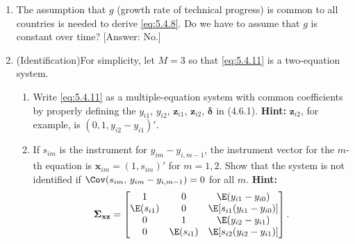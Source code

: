\begin{enumerate}
\item The assumption that $g$ (growth rate of technical progress) is common to all
  countries is needed to derive \eqref{eq:5.4.8}. Do we have to assume that $g$ is constant
  over time? [Answer: No.]

\item (Identification)\quad For simplicity, let $M = 3$ so that \eqref{eq:5.4.11} is a two-equation
  system.
  \begin{enumerate}[label=(\alph*)]
  \item Write \eqref{eq:5.4.11} as a multiple-equation system with common coefficients by
    properly defining the $y_{i1}$, $y_{i2}$, $\mathbf{z}_{i1}$, $\mathbf{z}_{i2}$,
    $\boldsymbol{\delta}$ in (4.6.1). \textbf{Hint:}
    $\mathbf{z}_{i2}$, for example, is $(0, 1, y_{i2} - y_{i1})'$.
  \item If $s_{im}$ is the instrument for $y_{im} - y_{i,m-1}$, the instrument vector for
    the $m$-th equation is $\mathbf{x}_{im} = (1, s_{im})'$ for $m = 1, 2$. Show that the system is
    not identified if $\Cov(s_{im},\, y_{im} - y_{i,m-1}) = 0$ for all $m$.
    \textbf{Hint:}
    \[
      \boldsymbol{\Sigma}_{\mathbf{xz}} = \begin{bmatrix}
        1 & 0 & \E(y_{i1} - y_{i0}) \\
        \E(s_{i1}) & 0 & \E[s_{i1}(y_{i1} - y_{i0})] \\
        0 & 1 & \E(y_{i2} - y_{i1}) \\
        0 & \E(s_{i1}) & \E[s_{i2}(y_{i2} - y_{i1})]
      \end{bmatrix}.
    \]
  \end{enumerate}
\end{enumerate}
